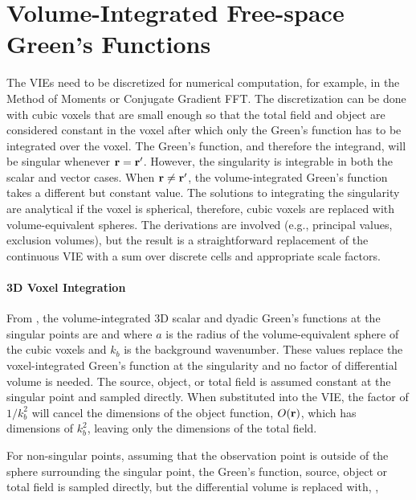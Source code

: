 \section{Volume-Integrated Free-space Green's Functions}
\label{volintfsgf}
The VIEs need to be discretized for numerical computation, for example, in the Method of Moments or Conjugate Gradient FFT. The discretization can be done with cubic voxels that are small enough so that the total field and object are considered constant in the voxel after which only the Green's function has to be integrated over the voxel. The Green's function, and therefore the integrand, will be singular whenever $\mathbf{r} = \mathbf{r}'$. However, the singularity is integrable in both the scalar and vector cases. When $\mathbf{r} \ne \mathbf{r}'$, the volume-integrated Green's function takes a different but constant value. The solutions to integrating the singularity are analytical if the voxel is spherical, therefore, cubic voxels are replaced with volume-equivalent spheres. The derivations are  involved (e.g., principal values, exclusion volumes), but the result is a straightforward replacement of the continuous VIE with a sum over discrete cells and appropriate scale factors.

\paragraph{3D Voxel Integration}

From \cite{chew1995waves,gao2005analytical}, the volume-integrated 3D scalar and dyadic Green's functions at the singular points are 
and
\noindent where $a$ is the radius of the volume-equivalent sphere of the cubic voxels and $k_b$ is the background wavenumber. These values replace the voxel-integrated Green's function at the singularity and no factor of differential volume is needed. The source, object, or total field is assumed constant at the singular point and sampled directly. When substituted into the VIE, the factor of $1/k_b^2$ will cancel the dimensions of the object function, $O(\mathbf{r})$, which has dimensions of $k_b^2$, leaving only the dimensions of the total field. 

For non-singular points, assuming that the observation point is outside of the sphere surrounding the singular point, the Green's function, source, object or total field is sampled directly, but the differential volume is replaced with, \cite{gao2005analytical},  

